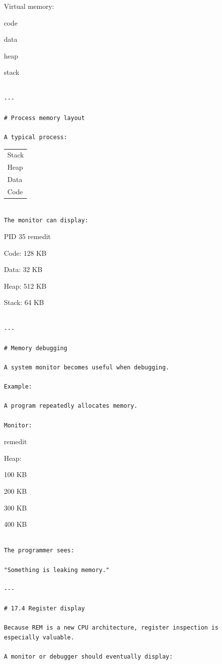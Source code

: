 \documentclass[
  oneside,
  openany]{book}
\begin{document}
Virtual memory:

code

data

heap

stack

\begin{verbatim}

---

# Process memory layout

A typical process:
\end{verbatim}

\begin{longtable}[]{@{}
  >{\raggedright\arraybackslash}p{}@{}}
\toprule\noalign{}
\endhead
\bottomrule\noalign{}
\endlastfoot
Stack \\
Heap \\
Data \\
Code \\
\end{longtable}

\begin{verbatim}

The monitor can display:
\end{verbatim}

PID 35 remedit

Code: 128 KB

Data: 32 KB

Heap: 512 KB

Stack: 64 KB

\begin{verbatim}

---

# Memory debugging

A system monitor becomes useful when debugging.

Example:

A program repeatedly allocates memory.

Monitor:
\end{verbatim}

remedit

Heap:

100 KB

200 KB

300 KB

400 KB

\begin{verbatim}

The programmer sees:

"Something is leaking memory."

---

# 17.4 Register display

Because REM is a new CPU architecture, register inspection is especially valuable.

A monitor or debugger should eventually display:
\end{verbatim}
\end{document}

